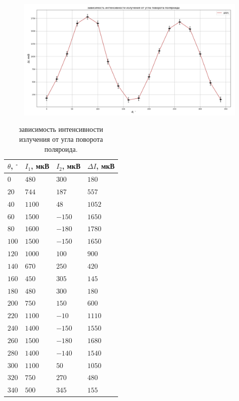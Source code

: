 \documentclass[a4paper,12pt]{article}
\theoremstyle{definition}
\begin{document}
\begin{figure}[H]
	\centering
	\includegraphics[scale=0.4]{graph.png}
\end{figure}

\begin{table}[h]
	\centering
	\caption{зависимость интенсивности излучения от угла поворота поляроида.}
	\begin{tabular}{|*{4}{l|}} \hline
		$\theta$, $^{\circ}$ & $I_1$, мкВ & $I_2$, мкВ & $\Delta I$, мкВ  \\ \hline
		$0$   & $480$  &  $300$ & $180$  \\ \hline
		$20$  & $744$  &  $187$ & $557$  \\ \hline
		$40$  & $1100$ &   $48$ & $1052$  \\ \hline
		$60$  & $1500$ & $-150$ & $1650$  \\ \hline
		$80$  & $1600$ & $-180$ & $1780$  \\ \hline
		$100$ & $1500$ & $-150$ & $1650$  \\ \hline
		$120$ & $1000$ &  $100$ & $900$  \\ \hline
		$140$ & $670$  &  $250$ & $420$  \\ \hline
		$160$ & $450$  &  $305$ & $145$  \\ \hline
		$180$ & $480$  &  $300$ & $180$  \\ \hline
		$200$ & $750$  &  $150$ & $600$  \\ \hline
		$220$ & $1100$ &  $-10$ & $1110$  \\ \hline
		$240$ & $1400$ & $-150$ & $1550$  \\ \hline
		$260$ & $1500$ & $-180$ & $1680$  \\ \hline
		$280$ & $1400$ & $-140$ & $1540$  \\ \hline
		$300$ & $1100$ &   $50$ & $1050$  \\ \hline
		$320$ & $750$  &  $270$ & $480$  \\ \hline
		$340$ & $500$  &  $345$ & $155$  \\ \hline
	\end{tabular}
\end{table}
\end{document}
